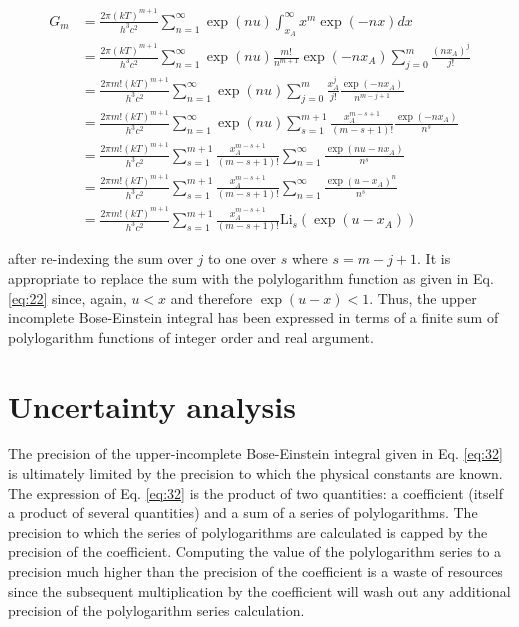 \documentclass[letterpaper,12pt]{article}
\newcommand{\Li}{\textrm{Li}}
\begin{document}
\begin{align} \label{eq:32}
G_{m} &= \frac{2\pi (kT)^{m+1}}{h^{3} c^{2}} \sum_{n = 1}^{\infty} \exp(nu) \int_{x_{A}}^{\infty} x^{m} \exp(-nx) dx \nonumber \\
 &= \frac{2\pi (kT)^{m+1}}{h^{3} c^{2}} \sum_{n = 1}^{\infty} \exp(nu) \frac{m!}{n^{m+1}} \exp(-n x_{A}) \sum_{j = 0}^{m} \frac{(n x_{A})^{j}}{j!} \nonumber \\
 &= \frac{2\pi m! (kT)^{m+1}}{h^{3} c^{2}} \sum_{n = 1}^{\infty} \exp(nu) \sum_{j = 0}^{m} \frac{x_{A}^{j}}{j!} \frac{\exp(-n x_{A})}{n^{m-j+1}} \nonumber \\
 &= \frac{2\pi m! (kT)^{m+1}}{h^{3} c^{2}} \sum_{n = 1}^{\infty} \exp(nu) \sum_{s = 1}^{m+1} \frac{x_{A}^{m-s+1}}{(m-s+1)!} \frac{\exp(-n x_{A})}{n^{s}} \nonumber \\
 &= \frac{2\pi m! (kT)^{m+1}}{h^{3} c^{2}} \sum_{s = 1}^{m+1} \frac{x_{A}^{m-s+1}}{(m-s+1)!} \sum_{n = 1}^{\infty} \frac{\exp(nu-n x_{A})}{n^{s}} \nonumber \\
 &= \frac{2\pi m! (kT)^{m+1}}{h^{3} c^{2}} \sum_{s = 1}^{m+1} \frac{x_{A}^{m-s+1}}{(m-s+1)!} \sum_{n = 1}^{\infty} \frac{\exp(u-x_{A})^{n}}{n^{s}} \nonumber \\
 &= \frac{2\pi m! (kT)^{m+1}}{h^{3} c^{2}} \sum_{s = 1}^{m+1} \frac{x_{A}^{m-s+1}}{(m-s+1)!} \Li_{s} \left( \exp(u-x_{A}) \right)
\end{align}

\noindent after re-indexing the sum over $j$ to one over $s$ where $s = m - j + 1$. It is appropriate to replace the sum with the polylogarithm function as given in Eq. \ref{eq:22} since, again, $u < x$ and therefore $\exp(u-x) < 1$. Thus, the upper incomplete Bose-Einstein integral has been expressed in terms of a finite sum of polylogarithm functions of integer order and real argument.


\section{Uncertainty analysis}
The precision of the upper-incomplete Bose-Einstein integral given in Eq. \ref{eq:32} is ultimately limited by the precision to which the physical constants are known. The expression of Eq. \ref{eq:32} is the product of two quantities: a coefficient (itself a product of several quantities) and a sum of a series of polylogarithms. The precision to which the series of polylogarithms are calculated is capped by the precision of the coefficient. Computing the value of the polylogarithm series to a precision much higher than the precision of the coefficient is a waste of resources since the subsequent multiplication by the coefficient will wash out any additional precision of the polylogarithm series calculation.
\end{document}
